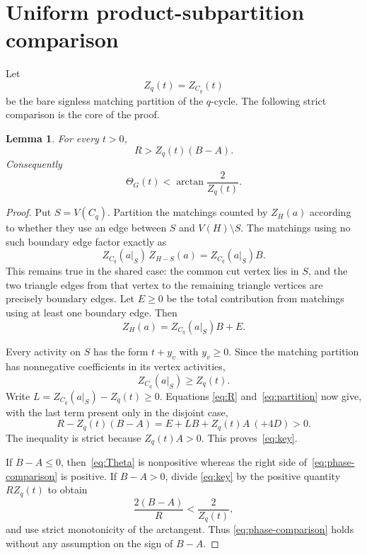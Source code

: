 \documentclass[11pt]{article}
\newtheorem{lemma}[theorem]{Lemma}
\theoremstyle{remark}
\begin{document}
\section{Uniform product-subpartition comparison}

Let
\begin{equation}\label{eq:Zq}
 Z_q(t)=Z_{C_q}(t)
\end{equation}
be the bare signless matching partition of the $q$-cycle.  The following
strict comparison is the core of the proof.

\begin{lemma}\label{lem:product}
For every $t>0$,
\begin{equation}\label{eq:key}
 R>Z_q(t)(B-A).
\end{equation}
Consequently
\begin{equation}\label{eq:phase-comparison}
 \Theta_G(t)<\arctan\frac{2}{Z_q(t)}.
\end{equation}
\end{lemma}

\begin{proof}
Put $S=V(C_q)$.  Partition the matchings counted by $Z_H(a)$ according to
whether they use an edge between $S$ and $V(H)\setminus S$.  The matchings
using no such boundary edge factor exactly as
\[
 Z_{C_q}(a|_S)\,Z_{H-S}(a)=Z_{C_q}(a|_S)B.
\]
This remains true in the shared case: the common cut vertex lies in $S$, and
the two triangle edges from that vertex to the remaining triangle vertices
are precisely boundary edges.  Let $E\geq0$ be the total contribution from
matchings using at least one boundary edge.  Then
\begin{equation}\label{eq:partition}
 Z_H(a)=Z_{C_q}(a|_S)B+E.
\end{equation}

Every activity on $S$ has the form $t+y_v$ with $y_v\geq0$.  Since the
matching partition has nonnegative coefficients in its vertex activities,
\[
 Z_{C_q}(a|_S)\geq Z_q(t).
\]
Write $L=Z_{C_q}(a|_S)-Z_q(t)\geq0$.  Equations
\eqref{eq:R} and~\eqref{eq:partition} now give, with the last term present
only in the disjoint case,
\begin{equation}\label{eq:positive-difference}
 R-Z_q(t)(B-A)=E+LB+Z_q(t)A\ (+4D)>0.
\end{equation}
The inequality is strict because $Z_q(t)A>0$.  This proves~\eqref{eq:key}.

If $B-A\leq0$, then~\eqref{eq:Theta} is nonpositive whereas the right side
of~\eqref{eq:phase-comparison} is positive.  If $B-A>0$, divide
\eqref{eq:key} by the positive quantity $RZ_q(t)$ to obtain
\[
 \frac{2(B-A)}R<\frac2{Z_q(t)},
\]
and use strict monotonicity of the arctangent.  Thus
\eqref{eq:phase-comparison} holds without any assumption on the sign of
$B-A$.
\end{proof}
\end{document}
